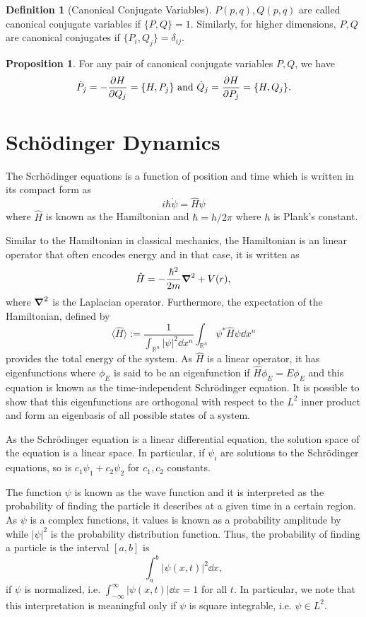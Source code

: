 \documentclass[]{article}
\theoremstyle{definition}
\theoremstyle{definition}
\newtheorem{definition}{Definition}[section]
\newtheorem{proposition}{Proposition}[section]
\begin{document}
\begin{definition}[Canonical Conjugate Variables]
  \(P(p, q), Q(p, q)\) are called canonical conjugate variables if \(\{P, Q\} = 1\). 
  Similarly, for higher dimensions, \(P, Q\) are canonical conjugates if 
  \(\{P_i, Q_j\} = \delta_{ij}\).
\end{definition}

\begin{proposition}
  For any pair of canonical conjugate variables \(P, Q\), we have 
  \[\dot P_j = - \pdv{H}{Q_j} = \{H, P_j\} \text{ and } 
    \dot Q_j = \pdv{H}{P_j} = \{H, Q_j\}.\]
\end{proposition}

\newpage
\section{Schödinger Dynamics}

The Scrhödinger equations is a function of position and time which is written 
in its compact form as 
\[i \hbar \dot \psi = \hat H \psi\]
where \(\hat H\) is known as the Hamiltonian and \(\hbar = h / 2\pi\) where 
\(h\) is Plank's constant. 

Similar to the Hamiltonian in classical mechanics, 
the Hamiltonian is an linear operator that often encodes energy and in that case, 
it is written as 
\[\hat H = - \frac{\hbar^2}{2m} \grad^2 + V(r),\]
where \(\grad^2\) is the Laplacian operator. Furthermore, the expectation 
of the Hamiltonian, defined by 
\[\langle \hat H \rangle := \frac{1}{\int_{\mathbb{R}^n} |\psi|^2 \dd x^n} 
  \int_{\mathbb{R}^n}\psi^* \hat H \psi \dd x^n\]
provides the total energy of the system.
As \(\hat H\) is a linear operator, it has eigenfunctions where \(\phi_E\) is 
said to be an eigenfunction if \(\hat H \phi_E = E \phi_E\) and this equation 
is known as the time-independent Schrödinger equation. It is possible to show that 
this eigenfunctions are orthogonal with respect to the \(L^2\) inner product 
and form an eigenbasis of all possible states of a system.

As the Schrödinger equation is a linear differential equation, the solution space 
of the equation is a linear space. In particular, if \(\psi_i\) are solutions 
to the Schrödinger equations, so is \(c_1 \psi_1 + c_2 \psi_2\) for \(c_1, c_2\) 
constants.

The function \(\psi\) is known as the wave function and it is interpreted as 
the probability of finding the particle it describes at a given time in a certain 
region. As \(\psi\) is a complex functions, it values is known as a probability 
amplitude by while \(|\psi|^2\) is the probability distribution function. Thus, 
the probability of finding a particle is the interval \([a, b]\) is 
\[\int_a^b |\psi(x, t)|^2 \dd x,\]
if \(\psi\) is normalized, i.e. \(\int_{-\infty}^\infty |\psi(x, t)| \dd x = 1\) 
for all \(t\). In particular, we note that this interpretation is meaningful 
only if \(\psi\) is square integrable, i.e. \(\psi \in L^2\).
\end{document}
